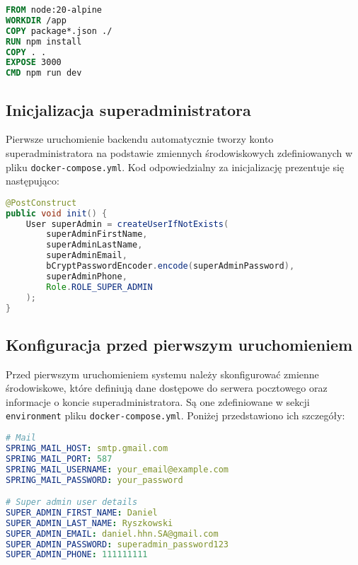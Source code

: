 \begin{lstlisting}[language=Dockerfile, caption=Dockerfile frontendu]
FROM node:20-alpine
WORKDIR /app
COPY package*.json ./
RUN npm install
COPY . .
EXPOSE 3000
CMD npm run dev
\end{lstlisting}

\subsection{Inicjalizacja superadministratora}

Pierwsze uruchomienie backendu automatycznie tworzy konto superadministratora na podstawie zmiennych środowiskowych zdefiniowanych w pliku \texttt{docker-compose.yml}. Kod odpowiedzialny za inicjalizację prezentuje się następująco:

\begin{lstlisting}[language=Java, caption=Kod inicjalizacji superadministratora]
@PostConstruct
public void init() {
    User superAdmin = createUserIfNotExists(
        superAdminFirstName,
        superAdminLastName,
        superAdminEmail,
        bCryptPasswordEncoder.encode(superAdminPassword),
        superAdminPhone,
        Role.ROLE_SUPER_ADMIN
    );
}
\end{lstlisting}

\subsection{Konfiguracja przed pierwszym uruchomieniem}

Przed pierwszym uruchomieniem systemu należy skonfigurować zmienne środowiskowe, które definiują dane dostępowe do serwera pocztowego oraz informacje o koncie superadministratora. Są one zdefiniowane w sekcji \texttt{environment} pliku \texttt{docker-compose.yml}. Poniżej przedstawiono ich szczegóły:

\begin{lstlisting}[language=yaml, caption=Konfiguracja zmiennych środowiskowych]
# Mail
SPRING_MAIL_HOST: smtp.gmail.com
SPRING_MAIL_PORT: 587
SPRING_MAIL_USERNAME: your_email@example.com
SPRING_MAIL_PASSWORD: your_password

# Super admin user details
SUPER_ADMIN_FIRST_NAME: Daniel
SUPER_ADMIN_LAST_NAME: Ryszkowski
SUPER_ADMIN_EMAIL: daniel.hhn.SA@gmail.com
SUPER_ADMIN_PASSWORD: superadmin_password123
SUPER_ADMIN_PHONE: 111111111
\end{lstlisting}

